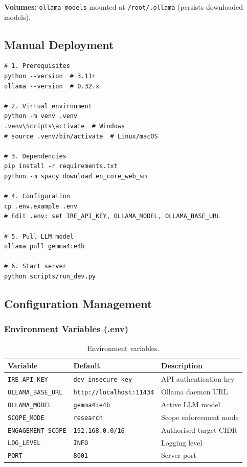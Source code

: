 \documentclass[10pt,journal,onecolumn]{IEEEtran}
\begin{document}
\noindent\textbf{Volumes:} \texttt{ollama\_models} mounted at \texttt{/root/.ollama} (persists downloaded models).

\subsection{Manual Deployment}
\begin{lstlisting}
# 1. Prerequisites
python --version  # 3.11+
ollama --version  # 0.32.x

# 2. Virtual environment
python -m venv .venv
.venv\Scripts\activate  # Windows
# source .venv/bin/activate  # Linux/macOS

# 3. Dependencies
pip install -r requirements.txt
python -m spacy download en_core_web_sm

# 4. Configuration
cp .env.example .env
# Edit .env: set IRE_API_KEY, OLLAMA_MODEL, OLLAMA_BASE_URL

# 5. Pull LLM model
ollama pull gemma4:e4b

# 6. Start server
python scripts/run_dev.py
\end{lstlisting}

\subsection{Configuration Management}

\subsubsection{Environment Variables (.env)}
\begin{table}[t]
\caption{Environment variables.}
\label{tab:envvars}
\begin{tabularx}{\textwidth}{>{\ttfamily}l >{\ttfamily}l X}
\toprule
\textbf{Variable} & \textbf{Default} & \textbf{Description}\\
\midrule
\texttt{IRE\_API\_KEY} & \texttt{dev\_insecure\_key} & API authentication key\\
\texttt{OLLAMA\_BASE\_URL} & \texttt{http://localhost:11434} & Ollama daemon URL\\
\texttt{OLLAMA\_MODEL} & \texttt{gemma4:e4b} & Active LLM model\\
\texttt{SCOPE\_MODE} & \texttt{research} & Scope enforcement mode\\
\texttt{ENGAGEMENT\_SCOPE} & \texttt{192.168.0.0/16} & Authorised target CIDR\\
\texttt{LOG\_LEVEL} & \texttt{INFO} & Logging level\\
\texttt{PORT} & \texttt{8001} & Server port\\
\bottomrule
\end{tabularx}
\end{table}
\end{document}
